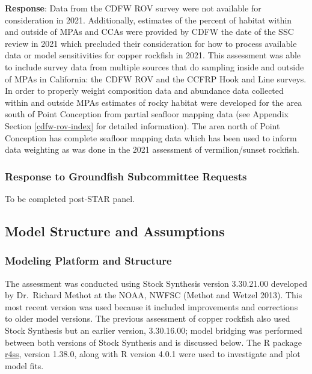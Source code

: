 \documentclass[11pt,
  english,
  letterpaper,
]{article}
\begin{document}
\textbf{Response}: Data from the CDFW ROV survey were not available for consideration in 2021. Additionally, estimates of the percent of habitat within and outside of MPAs and CCAs were provided by CDFW the date of the SSC review in 2021 which precluded their consideration for how to process available data or model sensitivities for copper rockfish in 2021. This assessment was able to include survey data from multiple sources that do sampling inside and outside of MPAs in California: the CDFW ROV and the CCFRP Hook and Line surveys. In order to properly weight composition data and abundance data collected within and outside MPAs estimates of rocky habitat were developed for the area south of Point Conception from partial seafloor mapping data (see Appendix Section \ref{cdfw-rov-index} for detailed information). The area north of Point Conception has complete seafloor mapping data which has been used to inform data weighting as was done in the 2021 assessment of vermilion/sunset rockfish.

\hypertarget{response-to-groundfish-subcommittee-requests}{%
\subsubsection{Response to Groundfish Subcommittee Requests}\label{response-to-groundfish-subcommittee-requests}}

To be completed post-STAR panel.

\hypertarget{model-structure-and-assumptions}{%
\subsection{Model Structure and Assumptions}\label{model-structure-and-assumptions}}

\hypertarget{modeling-platform-and-structure}{%
\subsubsection{Modeling Platform and Structure}\label{modeling-platform-and-structure}}

The assessment was conducted using Stock Synthesis version 3.30.21.00 developed by Dr.~Richard Methot at the NOAA, NWFSC (Methot and Wetzel 2013). This most recent version was used because it included improvements and corrections to older model versions. The previous assessment of copper rockfish also used Stock Synthesis but an earlier version, 3.30.16.00; model bridging was performed between both versions of Stock Synthesis and is discussed below. The R package \href{https://github.com/r4ss/r4ss}{r4ss}, version 1.38.0, along with R version 4.0.1 were used to investigate and plot model fits.
\end{document}

